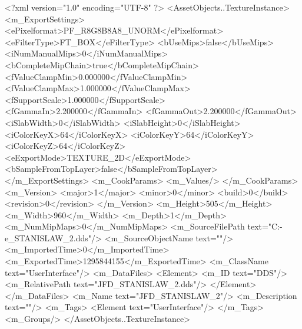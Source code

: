 <?xml version="1.0" encoding="UTF-8" ?>
<AssetObjects..TextureInstance>
	<m_ExportSettings>
		<ePixelformat>PF_R8G8B8A8_UNORM</ePixelformat>
		<eFilterType>FT_BOX</eFilterType>
		<bUseMips>false</bUseMips>
		<iNumManualMips>0</iNumManualMips>
		<bCompleteMipChain>true</bCompleteMipChain>
		<fValueClampMin>0.000000</fValueClampMin>
		<fValueClampMax>1.000000</fValueClampMax>
		<fSupportScale>1.000000</fSupportScale>
		<fGammaIn>2.200000</fGammaIn>
		<fGammaOut>2.200000</fGammaOut>
		<iSlabWidth>0</iSlabWidth>
		<iSlabHeight>0</iSlabHeight>
		<iColorKeyX>64</iColorKeyX>
		<iColorKeyY>64</iColorKeyY>
		<iColorKeyZ>64</iColorKeyZ>
		<eExportMode>TEXTURE_2D</eExportMode>
		<bSampleFromTopLayer>false</bSampleFromTopLayer>
	</m_ExportSettings>
	<m_CookParams>
		<m_Values/>
	</m_CookParams>
	<m_Version>
		<major>1</major>
		<minor>0</minor>
		<build>0</build>
		<revision>0</revision>
	</m_Version>
	<m_Height>505</m_Height>
	<m_Width>960</m_Width>
	<m_Depth>1</m_Depth>
	<m_NumMipMaps>0</m_NumMipMaps>
	<m_SourceFilePath text="C:\Users\Deo-e\Desktop\JFD_STANISLAW_2.dds"/>
	<m_SourceObjectName text=""/>
	<m_ImportedTime>0</m_ImportedTime>
	<m_ExportedTime>1295844155</m_ExportedTime>
	<m_ClassName text="UserInterface"/>
	<m_DataFiles>
		<Element>
			<m_ID text="DDS"/>
			<m_RelativePath text="JFD_STANISLAW_2.dds"/>
		</Element>
	</m_DataFiles>
	<m_Name text="JFD_STANISLAW_2"/>
	<m_Description text=""/>
	<m_Tags>
		<Element text="UserInterface"/>
	</m_Tags>
	<m_Groups/>
</AssetObjects..TextureInstance>


